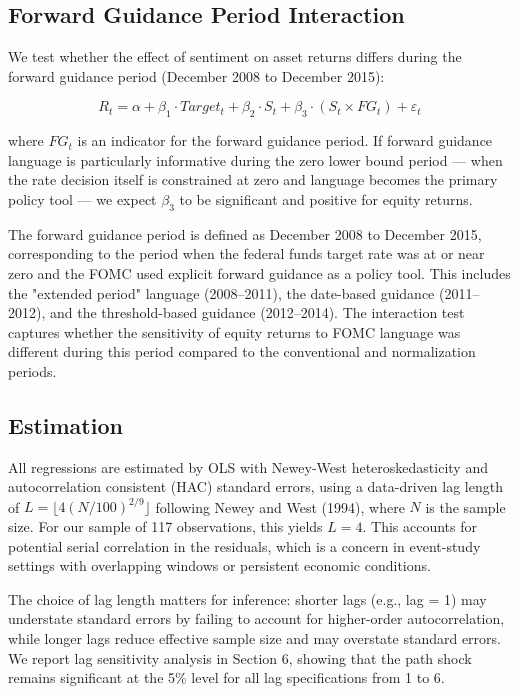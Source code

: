\documentclass[12pt]{article}
\begin{document}
\subsection{Forward Guidance Period Interaction}

We test whether the effect of sentiment on asset returns differs during the forward guidance period (December 2008 to December 2015):

\begin{equation*}
R_t = \alpha + \beta_1 \cdot Target_t + \beta_2 \cdot S_t + \beta_3 \cdot (S_t \times FG_t) + \varepsilon_t
\end{equation*}

where $FG_t$ is an indicator for the forward guidance period. If forward guidance language is particularly informative during the zero lower bound period --- when the rate decision itself is constrained at zero and language becomes the primary policy tool --- we expect $\beta_3$ to be significant and positive for equity returns.

The forward guidance period is defined as December 2008 to December 2015, corresponding to the period when the federal funds target rate was at or near zero and the FOMC used explicit forward guidance as a policy tool. This includes the "extended period" language (2008--2011), the date-based guidance (2011--2012), and the threshold-based guidance (2012--2014). The interaction test captures whether the sensitivity of equity returns to FOMC language was different during this period compared to the conventional and normalization periods.

\subsection{Estimation}

All regressions are estimated by OLS with Newey-West heteroskedasticity and autocorrelation consistent (HAC) standard errors, using a data-driven lag length of $L = \lfloor 4(N/100)^{2/9} \rfloor$ following Newey and West (1994), where $N$ is the sample size. For our sample of 117 observations, this yields $L = 4$. This accounts for potential serial correlation in the residuals, which is a concern in event-study settings with overlapping windows or persistent economic conditions.

The choice of lag length matters for inference: shorter lags (e.g., lag = 1) may understate standard errors by failing to account for higher-order autocorrelation, while longer lags reduce effective sample size and may overstate standard errors. We report lag sensitivity analysis in Section 6, showing that the path shock remains significant at the 5\% level for all lag specifications from 1 to 6.
\end{document}
